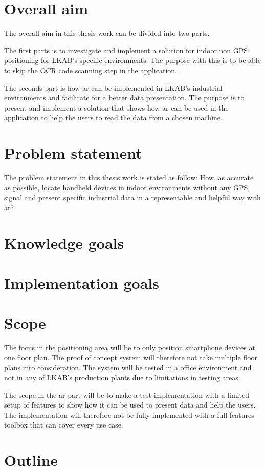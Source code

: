\section{Overall aim}
The overall aim in this thesis work can be divided into two parts.

\bigskip

The first parts is to investigate and implement a solution for indoor non GPS positioning for LKAB's specific environments.
The purpose with this is to be able to skip the OCR code scanning step in the application.

\bigskip

The seconds part is how \acrfull{ar} can be implemented in LKAB's industrial environments and facilitate for a better data presentation.
The purpose is to present and implement a solution that shows how \acrshort{ar} can be used in the application to help the users to read the data from a chosen machine.

\section{Problem statement}
The problem statement in this thesis work is stated as follow:
How, as accurate as possible, locate handheld devices in indoor environments without any GPS signal and present specific industrial data in a representable and helpful way with \acrlong{ar}?

\section{Knowledge goals}
\section{Implementation goals}

\section{Scope}
The focus in the positioning area will be to only position smartphone devices at one floor plan.
The proof of concept system will therefore not take multiple floor plans into consideration.
The system will be tested in a office environment and not in any of LKAB's production plants due to limitations in testing areas.

\bigskip

The scope in the \acrshort{ar}-part will be to make a test implementation with a limited setup of features to show how it can be used to present data and help the users.
The implementation will therefore not be fully implemented with a full features toolbox that can cover every use case.

\section{Outline}
